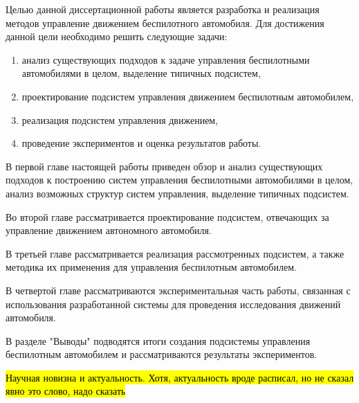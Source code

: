 Целью данной диссертационной работы является разработка и реализация методов управление движением беспилотного
автомобиля. Для достижения данной цели необходимо решить следующие задачи:

\begin{enumerate}
    \item анализ существующих подходов к задаче управления беспилотными автомобилями в целом, выделение
          типичных подсистем,
    \item проектирование подсистем управления движением беспилотным автомобилем,
    \item реализация подсистем управления движением,
    \item проведение экспериментов и оценка результатов работы.
\end{enumerate}

В первой главе настоящей работы приведен обзор и анализ существующих подходов к построению систем управления
беспилотными автомобилями в целом, анализ возможных структур систем управления, выделение типичных подсистем.

Во второй главе рассматривается проектирование подсистем, отвечающих за управление движением автономного
автомобиля.

В третьей главе рассматривается реализация рассмотренных подсистем, а также методика их применения для управления
беспилотным автомобилем.

В четвертой главе рассматриваются экспериментальная часть работы, связанная с использования разработанной системы
для проведения исследования движений автомобиля.

В разделе "Выводы" подводятся итоги создания подсистемы управления беспилотным автомобилем и рассматриваются
результаты экспериментов.

\hl{Научная новизна и актуальность. Хотя, актуальность вроде расписал, но не сказал явно это слово, надо сказать}
